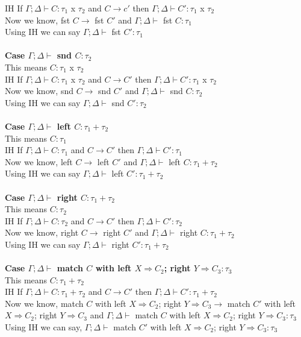 \documentclass{article}
\begin{document}
IH If $\Gamma; \Delta \vdash C : \tau_1$ x $\tau_2$ and  $C \to c'$ then $\Gamma; \Delta \vdash C' : \tau_1$ x $\tau_2$ \\
Now we know, fst $C \to$ fst $C'$ and $\Gamma;\Delta \vdash$ fst $C : \tau_1$ \\
Using IH we can say $\Gamma; \Delta \vdash$ fst $ C' : \tau_1$ \\\\
\textbf{Case $\Gamma; \Delta \vdash$ snd $C : \tau_2$ } \\
This means $C : \tau_1$ x $\tau_2$ \\
IH If $\Gamma; \Delta \vdash C : \tau_1$ x $\tau_2$ and  $C \to C'$ then $\Gamma; \Delta \vdash C' : \tau_1$ x $\tau_2$ \\
Now we know, snd $C \to$ snd $C'$ and $\Gamma; \Delta \vdash$ snd $C : \tau_2$ \\
Using IH we can say $\Gamma; \Delta \vdash$ snd $ C' : \tau_2$ \\\\
\textbf{Case $\Gamma; \Delta \vdash$ left $C : \tau_1+\tau_2$ } \\
This means $C : \tau_1$ \\
IH If $\Gamma; \Delta \vdash C : \tau_1$ and  $C \to C'$ then $\Gamma;\Delta \vdash C' : \tau_1$ \\
Now we know, left $C \to$ left $C'$ and $\Gamma; \Delta \vdash$ left $C : \tau_1+\tau_2$ \\
Using IH we can say $\Gamma; \Delta \vdash$ left $ C' : \tau_1+\tau_2$ \\\\
\textbf{Case $\Gamma; \Delta \vdash$ right $C : \tau_1+\tau_2$ } \\
This means $C : \tau_2$ \\
IH If $\Gamma; \Delta \vdash C : \tau_2$ and  $C \to C'$ then $\Gamma; \Delta \vdash C' : \tau_2$ \\
Now we know, right $C \to$ right $C'$ and $\Gamma; \Delta \vdash$ right $C : \tau_1+\tau_2$ \\
Using IH we can say $\Gamma;\Delta \vdash$ right $ C' : \tau_1+\tau_2$ \\\\
\textbf{Case $\Gamma;\Delta \vdash$ match $C$ with left $X \Rightarrow C_2 $; right $ Y \Rightarrow C_3 : \tau_3$ } \\
This means $C : \tau_1 + \tau_2$ \\
IH If $\Gamma;\Delta \vdash C : \tau_1+\tau_2$ and  $C \to C'$ then $\Gamma; \Delta \vdash C' : \tau_1+\tau_2$ \\
Now we know, match $C$ with left $X \Rightarrow C_2 $; right $ Y \Rightarrow C_3 \to$
match $C'$ with left $X \Rightarrow C_2 $; right $ Y \Rightarrow C_3$ and $\Gamma; \Delta \vdash$ match $C$ with left $X \Rightarrow C_2 $; right $ Y \Rightarrow C_3 : \tau_3$ \\
Using IH we can say, $\Gamma; \Delta \vdash$ match $C'$ with left $X \Rightarrow C_2 $; right $ Y \Rightarrow C_3 : \tau_3$ \\\\
\end{document}

